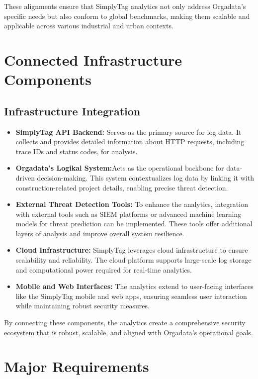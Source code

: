 These alignments ensure that SimplyTag analytics not only address Orgadata’s specific needs but also conform to global benchmarks, making them scalable and applicable across various industrial and urban contexts.

\chapter{Connected Infrastructure Components}

\section{Infrastructure Integration}

\begin{itemize}
	\item \textbf{SimplyTag API Backend:} Serves as the primary source for log data. It collects and provides detailed information about HTTP requests, including trace IDs and status codes, for analysis.
	\item \textbf{Orgadata’s Logikal System:}Acts as the operational backbone for data-driven decision-making. This system contextualizes log data by linking it with construction-related project details, enabling precise threat detection.
	\item \textbf{External Threat Detection Tools:} To enhance the analytics, integration with external tools such as SIEM platforms or advanced machine learning models for threat prediction can be implemented. These tools offer additional layers of analysis and improve overall system resilience.
	\item \textbf{Cloud Infrastructure:} SimplyTag leverages cloud infrastructure to ensure scalability and reliability. The cloud platform supports large-scale log storage and computational power required for real-time analytics.
	\item \textbf{Mobile and Web Interfaces:} The analytics extend to user-facing interfaces like the SimplyTag mobile and web apps, ensuring seamless user interaction while maintaining robust security measures.
\end{itemize}

By connecting these components, the analytics create a comprehensive security ecosystem that is robust, scalable, and aligned with Orgadata’s operational goals.

\chapter{Major Requirements}

